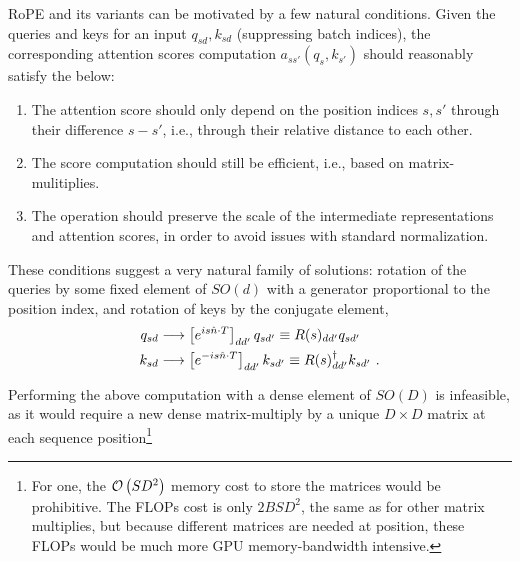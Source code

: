 RoPE and its variants can be motivated by a few natural conditions.  Given the queries and keys for
an input $ q _{ sd }, k _{ sd } $ (suppressing batch indices), the corresponding attention scores
computation $ a _{ ss' }\left ( q _{ s }, k _{ s' } \right ) $ should reasonably satisfy the below:
\begin{enumerate}
	\item The attention score should only depend on the position indices $ s, s' $ through their difference
	      $ s-s' $, i.e., through their relative distance to each other.
	\item The score computation should still be efficient, i.e., based on matrix-mulitiplies.
	\item The operation should preserve the scale of the intermediate representations and attention
	      scores, in order to avoid issues with standard normalization.
\end{enumerate}
These conditions suggest a very natural family of solutions: rotation of the queries by some fixed
element of $ SO(d) $ with a generator proportional to the position index, and rotation of keys by
the conjugate element,
\begin{align}
	q _{ sd } & \longrightarrow \left [e^{ i s \hat{n}\cdot T }\right ]_{ d d' } q _{ sd' } \equiv R(s) _{ d d' } q _{ sd' } \nonumber\\
	k _{ sd } & \longrightarrow \left [e^{ -i s \hat{n}\cdot T }\right ]_{ d d' } k _{ sd' } \equiv  R(s)^{ \dagger } _{ d d' } k _{ sd' } \ . \label{eq_rope}
\end{align}

Performing the above computation with a dense element of $ SO(D) $ is infeasible, as it would require
a new dense matrix-multiply by a unique $ D \times D $ matrix at each sequence
position\footnote{For one, the $ \mathcal{O} \left( SD ^{ 2 } \right)  $ memory cost to store the matrices
    would be prohibitive. The FLOPs cost is only $ 2BSD ^{ 2 } $, the same as for other matrix
    multiplies, but because different matrices are needed at position, these FLOPs would be much more
    GPU memory-bandwidth intensive.
}

